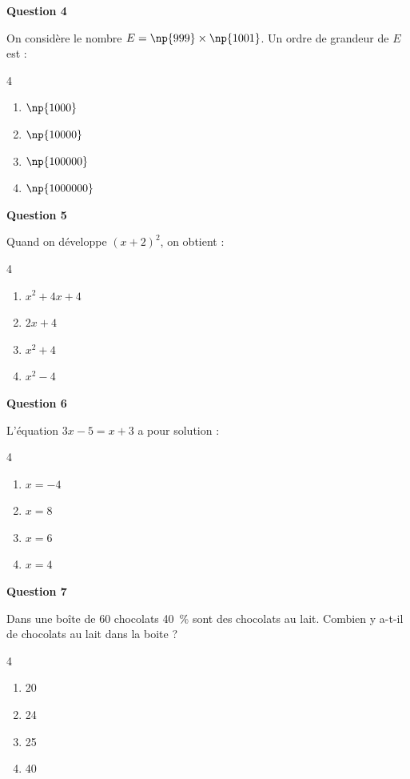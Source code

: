 \textbf{Question 4}

On considère le nombre $E = \np{999} \times \np{1001}$. Un ordre de grandeur de $E$ est :

\begin{multicols}{4}
\begin{enumerate}[label=\textbf{\alph* .}]
\item $\np{1000}$
\item $\np{10000}$
\item $\np{100000}$
\item $\np{1000000}$
\end{enumerate}
\end{multicols}

\textbf{Question 5}

Quand on développe $(x+2)^2$, on obtient :

\begin{multicols}{4}
\begin{enumerate}[label=\textbf{\alph* .}]
\item $x^2+4x+4$
\item $2x+4$
\item $x^2+4$
\item $x^2-4$
\end{enumerate}
\end{multicols}

\textbf{Question 6}

L'équation $ 3x - 5 = x + 3 $ a pour solution :

\begin{multicols}{4}
\begin{enumerate}[label=\textbf{\alph* .}]
\item $ x = -4 $
\item $ x = 8 $
\item $ x = 6 $
\item $ x = 4 $
\end{enumerate}
\end{multicols}

\pagebreak

\textbf{Question 7}

Dans une boîte de 60 chocolats 40~\% sont des chocolats au lait. Combien y a-t-il de chocolats au lait dans la boite ?

\begin{multicols}{4}
\begin{enumerate}[label=\textbf{\alph* .}]
\item 20
\item 24
\item 25
\item 40
\end{enumerate}
\end{multicols}

